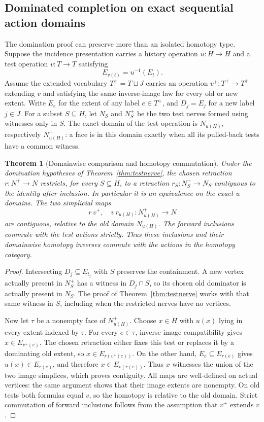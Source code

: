 \documentclass[11pt]{article}
\newtheorem{theorem}{Theorem}[section]
\theoremstyle{definition}
\begin{document}
\subsection{Dominated completion on exact sequential action domains}

The domination proof can preserve more than an isolated homotopy type.
Suppose the incidence presentation carries a history operation
$u:H\to H$ and a test operation $v:T\to T$ satisfying
\[
 E_{v(t)}=u^{-1}(E_t).
\]
Assume the extended vocabulary $T^+=T\sqcup J$ carries an operation
$v^+:T^+\to T^+$ extending $v$ and satisfying the same inverse-image
law for every old or new extent. Write $E_e$ for the extent of any label
$e\in T^+$, and $D_j=E_j$ for a new label $j\in J$. For a subset
$S\subseteq H$, let
$N_S$ and $N_S^+$ be the two test nerves formed using witnesses only
in $S$. The exact domain of the test operation is
$N_{u(H)}$, respectively $N^+_{u(H)}$: a face is in this domain
exactly when all its pulled-back tests have a common witness.

\begin{theorem}[Domainwise comparison and homotopy commutation]
\label{gt:action-domains}
Under the domination hypotheses of Theorem~\ref{thm:testnerve}, the
chosen retraction $r:N^+\to N$ restricts, for every $S\subseteq H$,
to a retraction $r_S:N_S^+\to N_S$ contiguous to the identity after
inclusion. In particular it is an equivalence on the exact $u$-domains.
The two simplicial maps
\[
 r\,v^+,\quad v\,r_{u(H)}:N^+_{u(H)}\longrightarrow N
\]
are contiguous, relative to the old domain $N_{u(H)}$.
The forward inclusions commute with the test actions strictly. Thus
these inclusions and their domainwise homotopy inverses commute with
the actions in the homotopy category.
\end{theorem}
\begin{proof}
Intersecting $D_j\subseteq E_{t_j}$ with $S$ preserves the containment.
A new vertex actually present in $N_S^+$ has a witness in $D_j\cap S$,
so its chosen old dominator is actually present in $N_S$. The proof of
Theorem~\ref{thm:testnerve} works with that same witness in $S$, including
when the restricted nerves have no vertices.

Now let $\tau$ be a nonempty face of $N^+_{u(H)}$. Choose $x\in H$
with $u(x)$ lying in every extent indexed by $\tau$. For every
$e\in\tau$, inverse-image compatibility gives $x\in E_{v^+(e)}$.
The chosen retraction either fixes this test or replaces it by a
dominating old extent, so $x\in E_{r(v^+(e))}$. On the other hand,
$E_e\subseteq E_{r(e)}$ gives $u(x)\in E_{r(e)}$, and therefore
$x\in E_{v(r(e))}$. Thus $x$ witnesses the union of the two image
simplices, which proves contiguity. All maps are well-defined on
actual vertices: the same argument shows that their image extents
are nonempty. On old tests both formulas equal $v$, so the homotopy
is relative to the old domain. Strict commutation of forward
inclusions follows from the assumption that $v^+$ extends $v$.
\end{proof}
\end{document}
